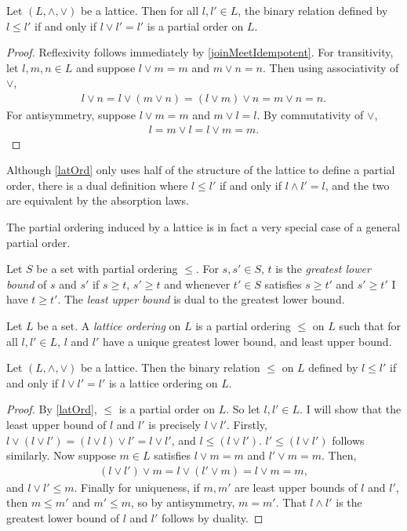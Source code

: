 \begin{prop}\label{latOrd}
  Let $(L, \wedge, \vee)$ be a lattice. Then for all $l, l' \in L$, the binary relation defined by $l \leq l'$ if and only if $l \vee l' = l'$
  is a partial order on $L$.
\end{prop}
\begin{proof}
  Reflexivity follows immediately by \cref{joinMeetIdempotent}. For transitivity, let $l, m, n \in L$ and suppose
  $l \vee m = m$ and $m \vee n = n$. Then using associativity of $\vee$,
  \begin{align*}
    l \vee n = l \vee (m \vee n) = (l \vee m) \vee n = m \vee n = n.
  \end{align*}
  For antisymmetry, suppose $l \vee m = m$ and $m \vee l = l$. By commutativity of $\vee$, 
  \begin{align*}
    l = m \vee l = l \vee m = m.
  \end{align*}
\end{proof}
\begin{remark}
  Although \cref{latOrd} only uses half of the structure of the lattice to define a partial order,
  there is a dual definition where $l \leq l'$ if and only if $l \wedge l' = l$, and the two are equivalent by the absorption laws.
\end{remark}
The partial ordering induced by a lattice is in fact a very special case of a general partial order.
\begin{definition}
  Let $S$ be a set with partial ordering $\leq$. For $s, s' \in S$, $t$ is the \emph{greatest lower bound} of $s$ and $s'$
  if $s \geq t$, $s' \geq t$ and whenever $t' \in S$ satisfies $s \geq t'$ and $s' \geq t'$ I have $t \geq t'$.
  The \emph{least upper bound} is dual to the greatest lower bound.
\end{definition}
\begin{definition}
  Let $L$ be a set. A \emph{lattice ordering} on $L$ is a partial ordering $\leq$ on $L$ such that for all $l, l' \in L$, $l$ and $l'$
  have a unique greatest lower bound, and least upper bound.
\end{definition}
\begin{prop}
  Let $(L, \wedge, \vee)$ be a lattice. Then the binary relation $\leq$ on $L$ defined by $l \leq l'$ if and only if
  $l \vee l' = l'$ is a lattice ordering on $L$.
\end{prop}
\begin{proof}
  By \cref{latOrd}, $\leq$ is a partial order on $L$. So let $l, l' \in L$. I will show that the least upper bound of
  $l$ and $l'$ is precisely $l \vee l'$. Firstly, $l \vee (l \vee l') = (l \vee l) \vee l' = l \vee l'$, and $l \leq (l \vee l')$.
  $l' \leq (l \vee l')$ follows similarly. Now suppose $m \in L$ satisfies $l \vee m = m$ and $l' \vee m = m$. Then,
  \begin{align*}
    (l \vee l') \vee m = l \vee (l' \vee m) = l \vee m = m,
  \end{align*}
  and $l \vee l' \leq m$. Finally for uniqueness, if $m, m'$ are least upper bounds of $l$ and $l'$, then $m \leq m'$ and $m' \leq m$,
  so by antisymmetry, $m = m'$. That $l \wedge l'$ is the greatest lower bound of $l$ and $l'$ follows by duality.
\end{proof}

